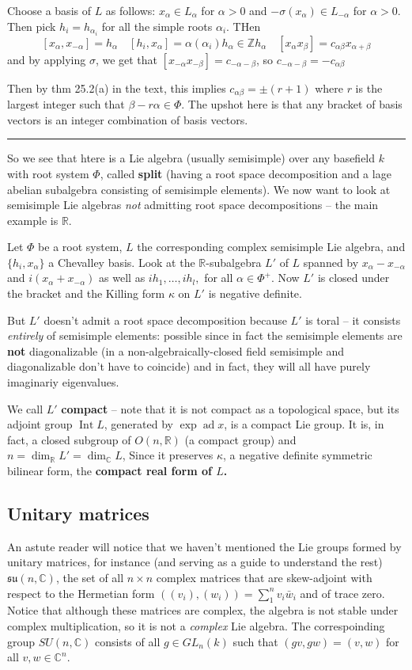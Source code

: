 \documentclass[12pt]{article}
\theoremstyle{nonumberbreak}
\theoremstyle{changebreak}
\theoremstyle{nonumberbreak}
\theoremstyle{change}
\newcommand*{\Z}{
\mathbb{Z}
}
\newcommand*{\R}{
\mathbb{R}
}
\newcommand*{\C}{
\mathbb{C}
}
\newcommand*{\brk}{
\rule{2in}{.1pt}
}
\DeclareMathOperator{\ad}{ad}
\DeclareMathOperator{\Int}{Int}
\begin{document}
Choose a basis of $L$ as follows: $x_\alpha\in L_\alpha$ for $\alpha>0$ and $-\sigma(x_\alpha)\in L_{-\alpha}$ for $\alpha>0$. 
Then pick $h_i=h_{\alpha_i}$ for all the simple roots $\alpha_i$. THen 
\[[x_\alpha,x_{-\alpha}]=h_\alpha\quad [h_i,x_{\alpha}]=\alpha(\alpha_i)h_\alpha\in\Z h_\alpha\quad [x_\alpha x_\beta]=c_{\alpha\beta}x_{\alpha+\beta}\]
and by applying $\sigma$, we get that $[x_{-\alpha}x_{-\beta}]=c_{-\alpha-\beta}$, so $c_{-\alpha-\beta}=-c_{\alpha\beta}$

Then by thm 25.2(a) in the text, this implies $c_{\alpha\beta}=\pm(r+1)$ where $r$ is the largest integer 
such that $\beta-r\alpha\in\Phi$. The upshot here is that any bracket of basis vectors is an integer combination of basis vectors.

\brk

So we see that htere is a Lie algebra (usually semisimple) over any basefield $k$ with root system $\Phi$, called \textbf{split}
(having a root space decomposition and a lage abelian subalgebra consisting of semisimple elements). We now want to look at semisimple Lie algebras 
\textit{not} admitting root space decompositions -- the main example is $\R$.

Let $\Phi$ be a root system, $L$ the corresponding complex semisimple Lie algebra, and $\{h_i,x_\alpha\}$
a Chevalley basis. Look at the $\R$-subalgebra $L'$ of $L$ spanned by $x_\alpha-x_{-\alpha}$ and $i(x_\alpha+x_{-\alpha})$ as well as $ih_1,\dots,ih_l,$ for all $\alpha\in\Phi^+$.
Now $L'$ is closed under the bracket and the Killing form $\kappa$ on $L'$ is negative definite. 

But $L'$ doesn't admit a root space decomposition because $L'$ is toral -- it consists \textit{entirely} of semisimple elements:
possible since in fact the semisimple elements are \textbf{not} diagonalizable (in a non-algebraically-closed field semisimple and diagonalizable don't have to coincide)
and in fact, they will all have purely imaginariy eigenvalues.

We call $L'$ \textbf{compact} -- note that it is not compact as a topological space, but its adjoint group $\Int L$, generated 
by $\exp\ad x$, is a compact Lie group. It is, in fact, a closed subgroup of $O(n,\R)$ (a compact group)
and $n=\dim_\R L'=\dim_\C L$, Since it preserves $\kappa$, a negative definite symmetric bilinear form, the \textbf{compact real form of $L$.}

\subsection{Unitary matrices}
An astute reader will notice that we haven't mentioned the Lie groups formed by unitary matrices, for instance (and 
serving as a guide to understand the rest) $\mathfrak{su}(n,\C)$, the set of all $n\times n$ complex matrices that are skew-adjoint
with respect to the Hermetian form $((v_i),(w_i))=\sum_1^n v_i\bar w_i$ and of trace zero.
Notice that although these matrices are complex, the algebra is not stable under complex multiplication, so it is not a \textit{complex} Lie algebra.
The correspoinding group $SU(n,\C)$ consists of all $g\in GL_n(k)$ such that $(gv,gw)=(v,w)$ for all $v,w\in\C^n$.
\end{document}
